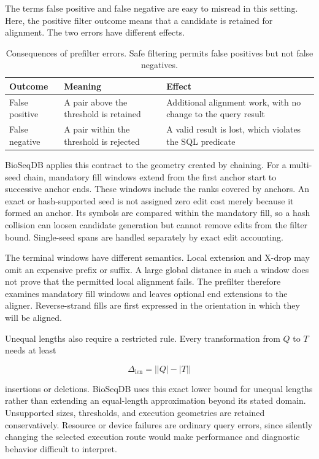 The terms false positive and false negative are easy to misread in this
setting. Here, the positive filter outcome means that a candidate is retained
for alignment. The two errors have different effects.

\begin{table}[htbp]
\centering
\small
\begin{tabular}{
    >{\raggedright\arraybackslash}p{}
    >{\raggedright\arraybackslash}p{}
    >{\raggedright\arraybackslash}p{}}
\textbf{Outcome} & \textbf{Meaning} & \textbf{Effect}\\
\hline
False positive & A pair above the threshold is retained & Additional alignment
work, with no change to the query result\\
False negative & A pair within the threshold is rejected & A valid result is
lost, which violates the SQL predicate\\
\end{tabular}
\caption{Consequences of prefilter errors. Safe filtering permits false
positives but not false negatives.}
\label{tab:prefilter-errors}
\end{table}

BioSeqDB applies this contract to the geometry created by chaining. For a
multi-seed chain, mandatory fill windows extend from the first anchor start to
successive anchor ends. These windows include the ranks covered by anchors.
An exact or hash-supported seed is not assigned zero edit cost merely because
it formed an anchor. Its symbols are compared within the mandatory fill, so a
hash collision can loosen candidate generation but cannot remove edits from
the filter bound. Single-seed spans are handled separately by exact edit
accounting.

The terminal windows have different semantics. Local extension and X-drop may
omit an expensive prefix or suffix. A large global distance in such a window
does not prove that the permitted local alignment fails. The prefilter
therefore examines mandatory fill windows and leaves optional end extensions
to the aligner. Reverse-strand fills are first expressed in the orientation in
which they will be aligned.

Unequal lengths also require a restricted rule. Every transformation from
\(Q\) to \(T\) needs at least

\[
    \Delta_{\mathrm{len}} = \bigl|\lvert Q\rvert-\lvert T\rvert\bigr|
\]

insertions or deletions. BioSeqDB uses this exact lower bound for unequal
lengths rather than extending an equal-length approximation beyond its stated
domain. Unsupported sizes, thresholds, and execution geometries are retained
conservatively. Resource or device failures are ordinary query errors, since
silently changing the selected execution route would make performance and
diagnostic behavior difficult to interpret.

